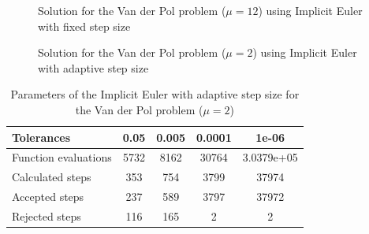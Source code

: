\begin{figure}[H]
    \centering
    \caption{Solution for the Van der Pol problem ($\mathit{\mu = 12}$) using Implicit Euler with fixed step size}
    \label{3_4_fixed_mu_12}
\end{figure}

\begin{figure}[H]
    \centering
    \caption{Solution for the Van der Pol problem ($\mathit{\mu = 2}$) using Implicit Euler with adaptive step size}
    \label{3_4_adaptive_mu_2}
\end{figure}

\begin{table}[H]
    \centering
    \begin{tabular}{@{}l|cccc@{}}
    \toprule
    Tolerances           & 0.05 & 0.005 & 0.0001 & 1e-06      \\ \midrule
    Function evaluations & 5732 & 8162  & 30764  & 3.0379e+05 \\
    Calculated steps     & 353  & 754   & 3799   & 37974      \\
    Accepted steps       & 237  & 589   & 3797   & 37972      \\
    Rejected steps       & 116  & 165   & 2      & 2          \\ \bottomrule
    \end{tabular}
    \caption{Parameters of the Implicit Euler with adaptive step size for the Van der Pol problem ($\mathit{\mu = 2}$)}
    \label{3_4_adaptive_mu_2_table}
\end{table}

